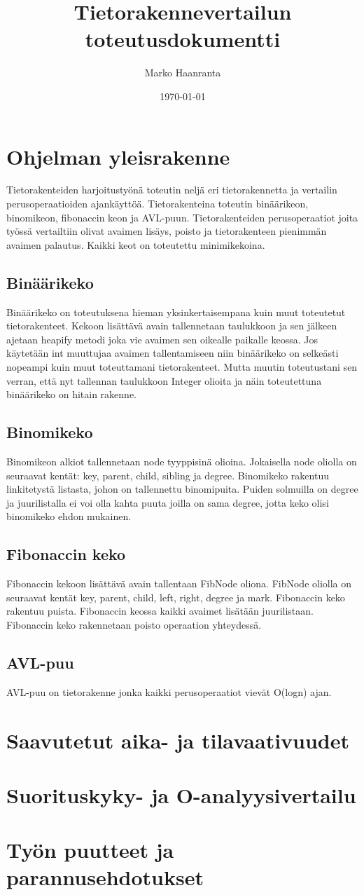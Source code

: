 \documentclass[11pt,a4paper]{article}
\author{Marko Haanranta}
\date{\today}
\title{Tietorakennevertailun toteutusdokumentti}
\begin{document}
\maketitle
\section{Ohjelman yleisrakenne}
Tietorakenteiden harjoitustyönä toteutin neljä eri tietorakennetta ja vertailin perusoperaatioiden ajankäyttöä. Tietorakenteina toteutin binäärikeon, binomikeon, fibonaccin keon ja AVL-puun. Tietorakenteiden perusoperaatiot joita työssä vertailtiin olivat avaimen lisäys, poisto ja tietorakenteen pienimmän avaimen palautus. Kaikki keot on toteutettu minimikekoina.
\subsection{Binäärikeko}
Binäärikeko on toteutuksena hieman yksinkertaisempana kuin muut toteutetut tietorakenteet. Kekoon lisättävä avain tallennetaan taulukkoon ja sen jälkeen ajetaan heapify metodi joka vie avaimen sen oikealle paikalle keossa. Jos käytetään int muuttujaa avaimen tallentamiseen niin binäärikeko on selkeästi nopeampi kuin muut toteuttamani tietorakenteet. Mutta muutin toteutustani sen verran, että nyt tallennan taulukkoon Integer olioita ja näin toteutettuna binäärikeko on hitain rakenne.
\subsection{Binomikeko}
Binomikeon alkiot tallennetaan node tyyppisinä olioina. Jokaisella node oliolla on seuraavat kentät: key, parent, child, sibling ja degree. Binomikeko rakentuu linkitetystä listasta, johon on tallennettu binomipuita. Puiden solmuilla on degree ja juurilistalla ei voi olla kahta puuta joilla on sama degree, jotta keko olisi binomikeko ehdon mukainen. 
\subsection{Fibonaccin keko}
Fibonaccin kekoon lisättävä avain tallentaan FibNode oliona. FibNode oliolla on seuraavat kentät key, parent, child, left, right, degree ja mark. Fibonaccin keko rakentuu puista. Fibonaccin keossa kaikki avaimet lisätään juurilistaan. Fibonaccin keko rakennetaan poisto operaation yhteydessä.
\subsection{AVL-puu}
AVL-puu on tietorakenne jonka kaikki perusoperaatiot vievät O(logn) ajan.
\section{Saavutetut aika- ja tilavaativuudet}
\section{Suorituskyky- ja O-analyysivertailu}

\section{Työn puutteet ja parannusehdotukset}
\end{document}
